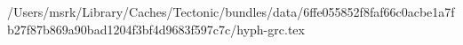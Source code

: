 /Users/msrk/Library/Caches/Tectonic/bundles/data/6ffe055852f8faf66c0acbe1a7fb27f87b869a90bad1204f3bf4d9683f597c7c/hyph-grc.tex